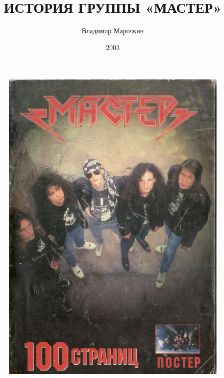 \documentclass[16pt,a5paper,oneside]{book}
\begin{document}
\title{ИСТОРИЯ ГРУППЫ «МАСТЕР»}
\author{Владимир Марочкин}
\date{2003}

\begin{figure}
    \centering
    \includegraphics[scale=0.6]{Cover1}
\end{figure}
\end{document}
